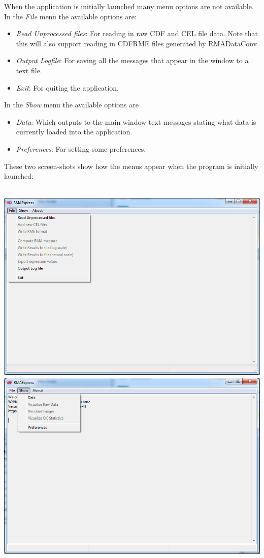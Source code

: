 \documentclass[11pt]{report}
\begin{document}
When the application is initially launched many menu options are not available. In the {\it File} menu the available options are:
\begin{itemize}
\item {\it Read Unprocessed files}: For reading in raw CDF and CEL file data. Note that this will also support reading in CDFRME files generated by RMADataConv 
\item {\it Output Logfile}: For saving all the messages that appear in the window to a text file.
\item {\it Exit}: For quiting the application.
\end{itemize}
In the {\it Show} menu the available options are\
\begin{itemize}
\item {\it Data}: Which outputs to the main window text messages stating what data is currently loaded into the application. 
\item {\it Preferences}: For setting some preferences. 
\end{itemize}
These two screen-shots show how the menus appear when the program is initially launched:\\ \\
\begin{center}
\includegraphics[scale=0.5]{Filemenu1}\\
\includegraphics[scale=0.5]{showmenu}
\end{center}
\end{document}
